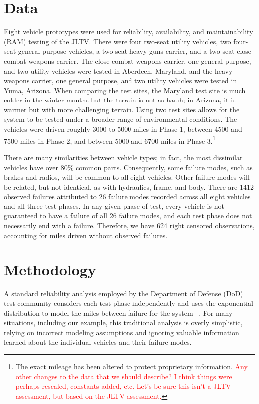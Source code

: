 \documentclass[12pt]{article}
\begin{document}
\section{Data}
Eight vehicle prototypes were used for reliability, availability, and maintainability (RAM) testing of the JLTV. There were four two-seat utility vehicles,
two four-seat general purpose vehicles, a two-seat heavy guns carrier, and a
two-seat close combat weapons carrier. The close combat weapons carrier, one
general purpose, and two utility vehicles were tested in Aberdeen, Maryland, and the heavy weapons carrier, one general purpose, and two utility vehicles
were tested in Yuma, Arizona. When comparing the test sites, the Maryland test site is much colder in the winter months but the terrain is not as harsh; in Arizona, it is warmer but with more challenging terrain. Using two test sites allows for the system to be tested under a broader range of environmental conditions.
The vehicles were driven roughly 3000 to 5000 miles in Phase 1, between
4500 and 7500 miles in Phase 2, and between 5000 and 6700 miles in Phase
3.\footnote{The exact mileage has been altered to protect proprietary information. \textcolor{red}{Any other changes to the data that we should describe? I think things were perhaps rescaled, constants added, etc. Let's be sure this isn't a JLTV assessment, but based on the JLTV assessment.}}

There are many similarities between vehicle types; in fact, the most dissimilar
vehicles have over 80\% common parts. Consequently, some failure modes, such as
brakes and radios, will be common to all eight vehicles. Other failure modes
will be related, but not identical, as with hydraulics, frame, and body. There are 1412 observed failures attributed to 26 failure modes recorded across
all eight vehicles and all three test phases. In any given phase of test, every
vehicle is not guaranteed to have a failure of all 26 failure modes, and each
test phase does not necessarily end with a failure. Therefore, we have 624 right
censored observations, accounting for miles driven without observed failures.

\section{Methodology}
A standard reliability analysis employed by the Department of Defense (DoD) test
community considers each test phase independently and uses the exponential
distribution to model the miles between failure for the system ~\cite{ref1}. For many situations, including our example, this
traditional analysis is overly simplistic, relying on incorrect modeling assumptions and ignoring valuable information learned about the individual vehicles and their failure modes.
\end{document}
